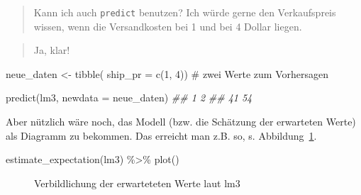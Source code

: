 \documentclass[
  letterpaper,
  oneside,
  open=any]{scrbook}
\newenvironment{Shaded}{\begin{snugshade}}{\end{snugshade}}
\newcommand{\AttributeTok}[1]{\textcolor[rgb]{0.40,0.45,0.13}{#1}}
\newcommand{\CommentTok}[1]{\textcolor[rgb]{0.37,0.37,0.37}{#1}}
\newcommand{\DecValTok}[1]{\textcolor[rgb]{0.68,0.00,0.00}{#1}}
\newcommand{\DocumentationTok}[1]{\textcolor[rgb]{0.37,0.37,0.37}{\textit{#1}}}
\newcommand{\FunctionTok}[1]{\textcolor[rgb]{0.28,0.35,0.67}{#1}}
\newcommand{\NormalTok}[1]{\textcolor[rgb]{0.00,0.23,0.31}{#1}}
\newcommand{\OtherTok}[1]{\textcolor[rgb]{0.00,0.23,0.31}{#1}}
\newcommand{\SpecialCharTok}[1]{\textcolor[rgb]{0.37,0.37,0.37}{#1}}
\theoremstyle{definition}
\theoremstyle{definition}
\theoremstyle{definition}
\theoremstyle{remark}
\begin{document}
\begin{quote}
{} Kann ich auch \texttt{predict} benutzen? Ich würde
gerne den Verkaufspreis wissen, wenn die Versandkosten bei 1 und bei 4
Dollar liegen.
\end{quote}

\begin{quote}
{} Ja, klar!
\end{quote}

\begin{Shaded}
\begin{Highlighting}[]
\NormalTok{neue\_daten }\OtherTok{\textless{}{-}} \FunctionTok{tibble}\NormalTok{(}
  \AttributeTok{ship\_pr =} \FunctionTok{c}\NormalTok{(}\DecValTok{1}\NormalTok{, }\DecValTok{4}\NormalTok{)) }\CommentTok{\# zwei Werte zum Vorhersagen}
\end{Highlighting}
\end{Shaded}

\begin{Shaded}
\begin{Highlighting}[]
\FunctionTok{predict}\NormalTok{(lm3, }\AttributeTok{newdata =}\NormalTok{ neue\_daten)}
\DocumentationTok{\#\#  1  2 }
\DocumentationTok{\#\# 41 54}
\end{Highlighting}
\end{Shaded}

Aber nützlich wäre noch, das Modell (bzw. die Schätzung der erwarteten
Werte) als Diagramm zu bekommen. Das erreicht man z.B. so, s.
Abbildung~\ref{fig-lm3}.

\begin{Shaded}
\begin{Highlighting}[]
\FunctionTok{estimate\_expectation}\NormalTok{(lm3) }\SpecialCharTok{\%\textgreater{}\%} \FunctionTok{plot}\NormalTok{()}
\end{Highlighting}
\end{Shaded}

\begin{figure}[H]


\caption{\label{fig-lm3}Verbildlichung der erwarteteten Werte laut lm3}

\end{figure}%
\end{document}

